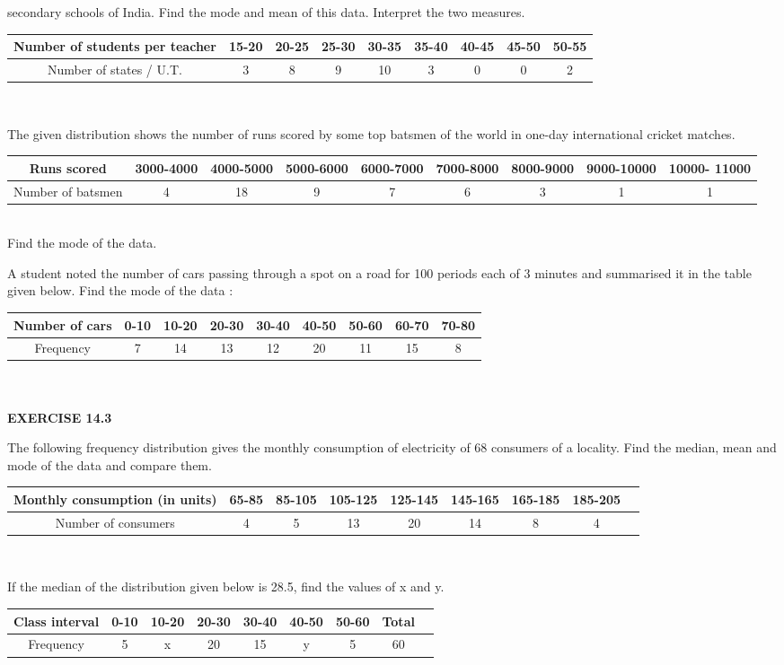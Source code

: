 secondary schools of India. Find the mode and mean of this data. Interpret the two
measures.
\begin{tabular}{|c|c|c|c|c|c|c|c|c|}
\hline
Number of students per teacher&15-20&20-25&25-30&30-35&35-40&40-45&45-50&50-55\\
\hline
Number of states / U.T.&3&8&9&10&3&0&0&2\\
\hline
\end{tabular}\\
\item The given distribution shows the number of runs scored by some top batsmen of the
world in one-day international cricket matches.
\begin{tabular}{|c|c|c|c|c|c|c|c|c|}
\hline
Runs scored&3000-4000&4000-5000&5000-6000&6000-7000&7000-8000&8000-9000&9000-10000&10000- 11000\\
\hline
Number of batsmen&4&18&9&7&6&3&1&1\\
\hline
\end{tabular}\\
Find the mode of the data.
\item A student noted the number of cars passing through a spot on a road for 100
periods each of 3 minutes and summarised it in the table given below. Find the mode
of the data :
\begin{tabular}{|c|c|c|c|c|c|c|c|c|}
\hline
Number of cars&0-10&10-20&20-30&30-40&40-50&50-60&60-70&70-80\\
\hline
Frequency&7&14&13&12&20&11&15&8\\
\hline
\end{tabular}\\\\
{\Large \textbf{EXERCISE 14.3}}
\item The following frequency distribution gives the monthly consumption of electricity of
68 consumers of a locality. Find the median, mean and mode of the data and compare
them.
\begin{tabular}{|c|c|c|c|c|c|c|c|c|}
\hline
Monthly consumption (in units)&65-85&85-105&105-125&125-145&145-165&165-185&185-205\\
\hline
Number of consumers&4&5&13&20&14&8&4\\
\hline
\end{tabular}\\
\item If the median of the distribution given below is 28.5, find the values of x and y.
\begin{tabular}{|c|c|c|c|c|c|c|c|c|}
\hline
Class interval&0-10&10-20&20-30&30-40&40-50&50-60& Total\\
\hline
Frequency&5&x&20&15&y&5&60\\
\hline
\end{tabular}\\

